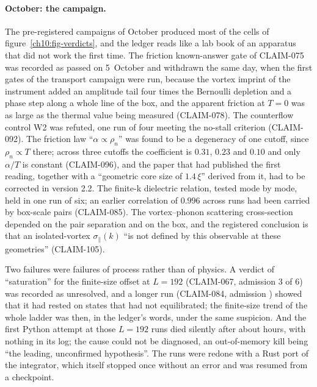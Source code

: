 \paragraph{October: the campaign.} The pre-registered campaigns of October produced most of the cells of figure~\ref{ch10:fig-verdicts}, and the
ledger reads like a lab book of an apparatus that did not work the first time. The friction known-answer gate of CLAIM-075 was recorded as passed on 5~October
and withdrawn the same day, when the first gates of the transport campaign were run, because the vortex imprint of the instrument added an amplitude tail four times the Bernoulli depletion and a phase step
along a whole line of the box, and the apparent friction at $T=0$ was as large as the thermal value being measured (CLAIM-078). The counterflow control
W2 was refuted, one run of four meeting the no-stall criterion (CLAIM-092). The friction law ``$\alpha\propto\rho_n$'' was found to be a degeneracy of
one cutoff, since $\rho_n\propto T$ there; across three cutoffs the coefficient is $0.31$, $0.23$ and $0.10$ and only $\alpha/T$ is constant
(CLAIM-096), and the paper that had published the first reading, together with a ``geometric core size of $1.4\,\xi$'' derived from it, had to be corrected in
version 2.2. The finite-k dielectric relation, tested mode by mode, held in one run of six; an earlier correlation of $0.996$ across runs had been carried by
box-scale pairs (CLAIM-085). The vortex--phonon scattering cross-section depended on the pair separation and on the box, and the registered conclusion is that an
isolated-vortex $\sigma_\parallel(k)$ ``is not defined by this observable at these geometries'' (CLAIM-105).

Two failures were failures of process rather than of physics. A verdict of ``saturation'' for the finite-size offset at $L=192$ (CLAIM-067,
admission $3$ of $6$) was recorded as unresolved, and a longer run (CLAIM-084, admission \NxQCFourAdm) showed that it had rested on states that had not
equilibrated; the finite-size trend of the whole ladder was then, in the ledger's words, under the same suspicion. And the first Python attempt
at those $L=192$ runs died silently after about \NxQCThreeHours{} hours, with nothing in its log; the cause could not be diagnosed, an out-of-memory
kill being ``the leading, unconfirmed hypothesis''. The runs were redone with a Rust port of the integrator, which itself stopped once without an error
and was resumed from a checkpoint.

